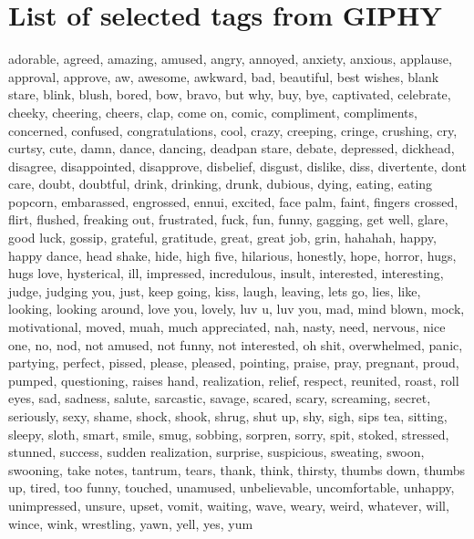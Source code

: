 \section{List of selected tags from GIPHY}
\label{appendix:SelectedTags}
adorable, agreed, amazing, amused, angry, annoyed, anxiety, anxious, applause, approval, approve, aw, awesome, awkward, bad, beautiful, best wishes, blank stare, blink, blush, bored, bow, bravo, but why, buy, bye, captivated, celebrate, cheeky, cheering, cheers, clap, come on, comic, compliment, compliments, concerned, confused, congratulations, cool, crazy, creeping, cringe, crushing, cry, curtsy, cute, damn, dance, dancing, deadpan stare, debate, depressed, dickhead, disagree, disappointed, disapprove, disbelief, disgust, dislike, diss, divertente, dont care, doubt, doubtful, drink, drinking, drunk, dubious, dying, eating, eating popcorn, embarassed, engrossed, ennui, excited, face palm, faint, fingers crossed, flirt, flushed, freaking out, frustrated, fuck, fun, funny, gagging, get well, glare, good luck, gossip, grateful, gratitude, great, great job, grin, hahahah, happy, happy dance, head shake, hide, high five, hilarious, honestly, hope, horror, hugs, hugs love, hysterical, ill, impressed, incredulous, insult, interested, interesting, judge, judging you, just, keep going, kiss, laugh, leaving, lets go, lies, like, looking, looking around, love you, lovely, luv u, luv you, mad, mind blown, mock, motivational, moved, muah, much appreciated, nah, nasty, need, nervous, nice one, no, nod, not amused, not funny, not interested, oh shit, overwhelmed, panic, partying, perfect, pissed, please, pleased, pointing, praise, pray, pregnant, proud, pumped, questioning, raises hand, realization, relief, respect, reunited, roast, roll eyes, sad, sadness, salute, sarcastic, savage, scared, scary, screaming, secret, seriously, sexy, shame, shock, shook, shrug, shut up, shy, sigh, sips tea, sitting, sleepy, sloth, smart, smile, smug, sobbing, sorpren, sorry, spit, stoked, stressed, stunned, success, sudden realization, surprise, suspicious, sweating, swoon, swooning, take notes, tantrum, tears, thank, think, thirsty, thumbs down, thumbs up, tired, too funny, touched, unamused, unbelievable, uncomfortable, unhappy, unimpressed, unsure, upset, vomit, waiting, wave, weary, weird, whatever, will, wince, wink, wrestling, yawn, yell, yes, yum

